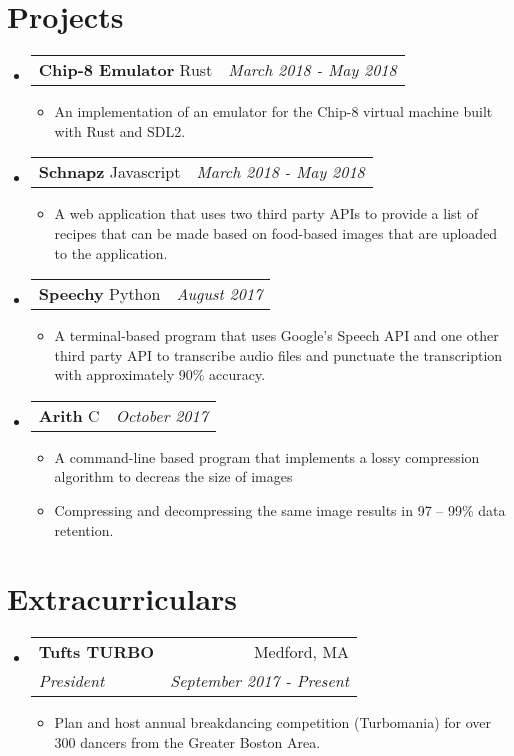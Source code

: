 \documentclass[letterpaper,11pt]{article}
\makeatletter
\newcommand{\resumeItem}[1]{
  \item[{{\textbullet}}]\small{{#1 \vspace{-2pt}}
  }
}
\newcommand{\resumeSubheading}[4]{
  \vspace{-1pt}\item[]
    \begin{tabular*}{0.97\textwidth}{l@{\extracolsep{\fill}}r}
      \textbf{#1} & #2 \\
      \textit{\small#3} & \textit{\small #4} \\
    \end{tabular*}\vspace{-5pt}
}
\newcommand{\projectSubheading}[3]{
  \vspace{-1pt}\item[]
    \begin{tabular*}{0.97\textwidth}{l@{\extracolsep{\fill}}r}
      \textbf{#1 \cdot \space}{\small #2}& \textit{\small #3} \\
    \end{tabular*}\vspace{-5pt}
}
\newcommand{\resumeSubHeadingListStart}{\begin{itemize}[leftmargin=*]}
\newcommand{\resumeSubHeadingListEnd}{\end{itemize}}
\newcommand{\resumeItemListStart}{\begin{itemize}}
\newcommand{\resumeItemListEnd}{\end{itemize}\vspace{-5pt}}
\makeatother
\begin{document}
\section{Projects}
  \resumeSubHeadingListStart
    \projectSubheading
      {Chip-8 Emulator}{Rust}{March 2018 - May 2018}
      \resumeItemListStart
        \resumeItem
          {An implementation of an emulator for the Chip-8 virtual machine built with Rust and SDL2.}
      \resumeItemListEnd

    \projectSubheading
      {Schnapz}{Javascript}{March 2018 - May 2018}
      \resumeItemListStart
        \resumeItem
          {A web application that uses two third party APIs to provide a list of recipes that can be made based on food-based images that are uploaded to the application.}
      \resumeItemListEnd
    \projectSubheading
      {Speechy}{Python}{August 2017}
      \resumeItemListStart
        \resumeItem
          {A terminal-based program that uses Google’s Speech API and one other third party API to transcribe audio files and punctuate the transcription with approximately 90\% accuracy.}
  
      \resumeItemListEnd

    \projectSubheading
      {Arith}{C}{October 2017}
      \resumeItemListStart
        \resumeItem
          {A command-line based program that implements a lossy compression algorithm to decreas the size of images}
        \resumeItem
          {Compressing and decompressing the same image results in 97 – 99\% data retention.}
      \resumeItemListEnd
  \resumeSubHeadingListEnd

\section{Extracurriculars}
\resumeSubHeadingListStart
  \resumeSubheading
    {Tufts TURBO}{Medford, MA}
      {President}{September 2017 - Present}
      \resumeItemListStart
        \resumeItem
          {Plan and host annual breakdancing competition (Turbomania) for over 300 dancers from the Greater Boston Area.}
      \resumeItemListEnd

\resumeSubHeadingListEnd
\end{document}
